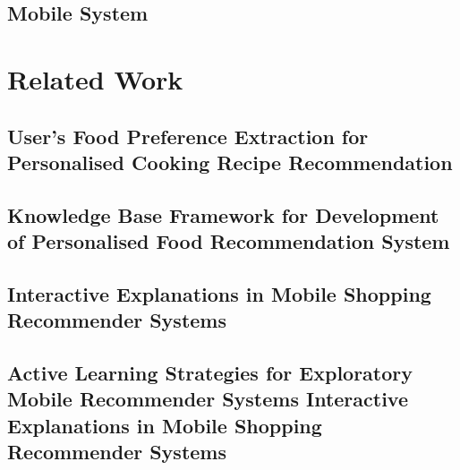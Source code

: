 \subsection{Mobile System}


\section{Related Work}

\subsection{User's Food Preference Extraction for Personalised Cooking Recipe Recommendation}

\subsection{Knowledge Base Framework for Development of Personalised Food Recommendation System}

\subsection{Interactive Explanations in Mobile Shopping Recommender Systems}

\subsection{Active Learning Strategies for Exploratory Mobile Recommender Systems Interactive Explanations in Mobile Shopping Recommender Systems}